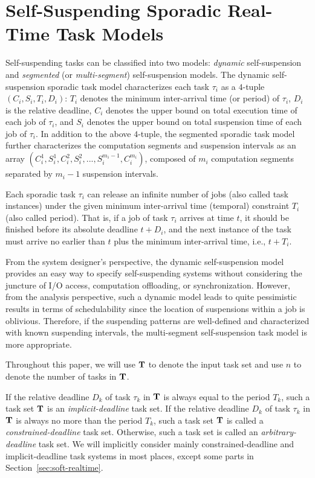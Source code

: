 \section{Self-Suspending Sporadic Real-Time Task Models}
  
Self-suspending tasks can be classified into two models: \emph{dynamic} self-suspension and \emph{segmented} (or \emph{multi-segment}) self-suspension models. 
The dynamic self-suspension sporadic task model characterizes each
task $\tau_i$ as a $4$-tuple $(C_i,S_i,T_i,D_i)$: $T_i$ denotes the minimum inter-arrival time (or period) of $\tau_i$, $D_i$ is the relative deadline,
$C_i$ denotes the upper bound on total execution time of each job of $\tau_i$,
and $S_i$ denotes the upper bound on total suspension time of each job of $\tau_i$.  In addition to the above $4$-tuple, the segmented sporadic task model further 
characterizes the computation segments and suspension intervals as an array
$(C_{i}^1,S_{i}^1,C_{i}^2,S_{i}^2,...,S_{i}^{m_i-1},C_{i}^{m_i})$, composed of $m_i$ computation segments separated by $m_i-1$ suspension intervals. 

Each sporadic task $\tau_i$ can release an infinite number of jobs
(also called task instances) under the given minimum inter-arrival
time (temporal) constraint $T_i$ (also called period).  That is, if a
job of task $\tau_i$ arrives at time $t$, it should be finished before
its absolute deadline $t+D_i$, and  the next instance of
the task must arrive no earlier than $t$ plus the minimum
inter-arrival time, i.e., $t + T_i$.

From the system designer's perspective, the dynamic self-suspension model provides an easy way to specify self-suspending systems without considering the juncture of I/O access, computation offloading, or synchronization. 
However, from the analysis perspective, such a  dynamic model leads to quite pessimistic results in terms of schedulability since the location of suspensions within a job is oblivious. Therefore, if the suspending patterns are well-defined and characterized with known suspending intervals, the multi-segment self-suspension task model is more appropriate.   


Throughout this paper, we will use ${\bf T}$ to denote the input task
set and use $n$ to denote the number of tasks in ${\bf T}$. 

If the relative deadline $D_k$ of task $\tau_k$ in ${\bf T}$ is always
equal to the period $T_k$, such a task set ${\bf T}$ is an
\emph{implicit-deadline} task set. If the relative deadline $D_k$ of
task $\tau_k$ in ${\bf T}$ is always no more than the period $T_k$,
such a task set ${\bf T}$ is called a \emph{constrained-deadline} task
set. Otherwise, such a task set is called an \emph{arbitrary-deadline}
task set. We will implicitly consider mainly constrained-deadline and
implicit-deadline task systems in most places, except some parts in
Section~\ref{sec:soft-realtime}.

